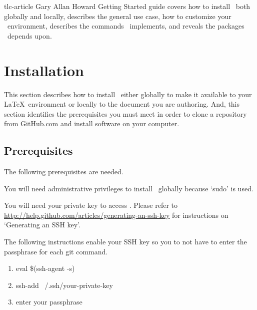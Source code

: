 \documentclass[12pt]{tlc-article}
\begin{document}

\tlcTitlePageAndTableOfContents
  {tlc-article}
  {Gary Allan Howard}
  {Getting Started guide covers how to install \tlcA\ both globally and
    locally, describes the general use case, how to customize your \tlcA\
    environment, describes the commands \tlcA\ implements, and reveals the
    packages \tlcA\ depends upon.}


\section{Installation}
This section describes how to install \tlcA\ either globally to make it
available to your \LaTeX\ environment or locally to the document you are
authoring.  And, this section identifies the prerequisites you must meet in
order to clone a repository from GitHub.com and install software on your
computer.

\subsection{Prerequisites}
The following prerequisites are needed.
\begin{description}[style=nextline]
  \item[Administrative privilege] You will need administrative privileges to
    install \tlcA\ globally because `sudo' is used.

  \item[SSH key] You will need your private key to access \gitHub.  Please refer
    to \url{http://help.github.com/articles/generating-an-ssh-key} for
    instructions on `Generating an SSH key'.

  \item[Enable your SSH key] The following instructions enable your SSH key so
    you to not have to enter the passphrase for each git command.

    \begin{enumerate}
      \item eval \$(ssh-agent -s)
      \item ssh-add ~/.ssh/your-private-key
      \item enter your passphrase
    \end{enumerate}

\end{description}
\end{document}
